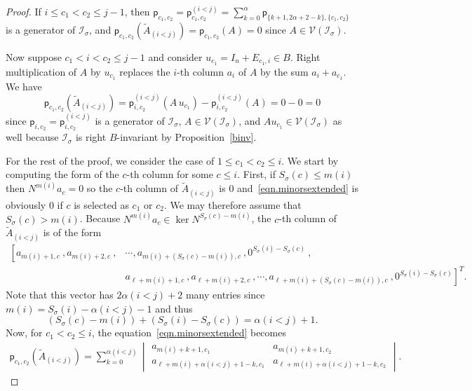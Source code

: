 \documentclass[10pt,a4paper]{amsart}
\newcommand{\al}{\alpha}
\newcommand{\ci}{\mathcal{I}}
\newcommand{\cv}{\mathcal{V}}
\newcommand{\gs}{\sigma}
\newcommand{\isigma}{\ci_\gs}
\renewcommand{\ker}{\operatorname{ker }}
\newcommand{\mi}[1]{m(#1)}
\newcommand{\pl}{\mathsf{p}}
\begin{document}
\begin{proof}
If $i\leq c_1<c_2\leq j-1$, then $\pl_{c_1, c_2} = \pl_{c_1, c_2}^{(i<j)}=\sum_{k=0}^{\al}\pl_{\{k+1, 2\al+2-k\}, \{c_1,c_2\}}$ is a generator of $\ci_\gs$, and $\pl_{c_1, c_2}\left(\widetilde A_{(i<j)}\right) = \pl_{c_1, c_2}\left(A\right)=0$ since $A\in \cv(\ci_\gs)$. 

Now suppose $c_1< i <c_2\leq j-1$ and consider $u_{c_1} = I_n + E_{c_1, i} \in B$. Right multiplication of $A$ by $u_{c_1}$ replaces the $i$-th column $a_i$ of $A$ by the sum $a_i+a_{c_1}$. We have 
\[
\pl_{c_1,c_2}\left(\widetilde A_{(i<j)}\right) =  \pl_{i,c_2}^{(i<j)}\left(A\, u_{c_1}\right) -  \pl_{i,c_2}^{(i<j)}\left(A\right)=0-0=0
\]
since $\pl_{i,c_2} = \pl_{i,c_2}^{(i<j)}$ is a generator of $\ci_\gs$, $A\in \cv(\isigma)$, and $Au_{c_1}\in \cv(\ci_\gs)$ as well because $\ci_\gs$ is right $B$-invariant by Proposition~\ref{binv}.


For the rest of the proof, we consider the case of $1\leq c_1<c_2\leq i$.  We start by computing the form of the $c$-th column for some $c\leq i$. First, if $S_\gs(c) \leq \mi{i}$ then $N^{\mi{i}}a_{c} =0$ so the $c$-th column of $\widetilde A_{(i<j)}$ is $0$ and~\eqref{eqn.minorsextended} is obviously $0$ if $c$ is selected as $c_1$ or $c_2$. We may therefore assume that $S_\gs(c) > \mi{i}$. Because $N^{\mi{i}} a_{c}\in \ker N^{S_\gs(c) - \mi{i}}$, the $c$-th column of $\widetilde A_{(i<j)}$ is of the form 
\begin{align} \label{eqn.colform}
\left[ a_{\mi{i}+1, c}\  \right.,  a_{m(i)+2, c}\ , &\cdots ,  a_{\mi{i}+(S_\gs(c)-\mi{i}), c}\ , 0^{S_\gs(i) - S_\gs(c)} \ ,   \\  
\nonumber &  a_{\ell+\mi{i}+1, c} \ ,    a_{\ell + m(i)+2, c}\ , \cdots , a_{\ell + \mi{i}+(S_\gs(c)-\mi{i}), c}\ ,\left. 0^{S_\gs(i) - S_\gs(c)}  \right]^T.
\end{align}
Note that this vector has $2\al(i<j)+2$ many entries since $\mi{i} = S_\gs(i)-\alpha(i<j)-1$ and thus 
\[
(S_\gs(c)-\mi{i}) + (S_\gs(i) -  S_{\gs}(c) )  =  \alpha(i<j)+1.
\]
Now, for $c_1<c_2\leq i$, the equation~\eqref{eqn.minorsextended} becomes
\begin{eqnarray}\label{eqn.minorsextended2}
\pl_{c_1,c_2}\left(\widetilde A_{(i<j)}\right) = \sum_{k=0}^{\al(i<j)} \begin{vmatrix} a_{\mi{i}+k+1, c_1} & a_{\mi{i}+k+1, c_2}\\ a_{\ell+\mi{i}+\al(i<j) +1 - k, c_1} & a_{\ell+\mi{i}+\al(i<j) +1 - k, c_2}  \end{vmatrix} .
\end{eqnarray}



\end{proof}
\end{document}

